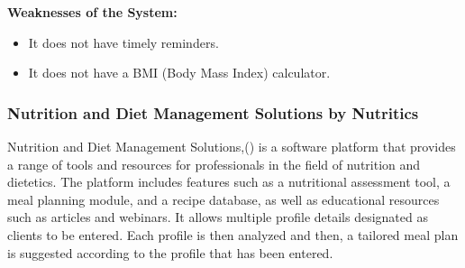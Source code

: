 \documentclass{article}
\begin{document}
\textbf{Weaknesses of the System:}
\begin{itemize}
\item It does not have timely reminders.
\item It does not have a BMI (Body Mass Index) calculator.
\end{itemize}

\subsubsection{Nutrition and Diet Management Solutions by Nutritics}

Nutrition and Diet Management Solutions,(\cite{nutritics}) is a software platform that provides a range of tools and resources for professionals in the field of nutrition and dietetics. The platform includes features such as a nutritional assessment tool, a meal planning module, and a recipe database, as well as educational resources such as articles and webinars. It allows multiple profile details designated as clients to be entered. Each profile is then analyzed and then, a tailored meal plan is suggested according to the profile that has been entered.
\end{document}
